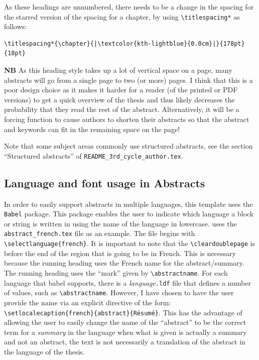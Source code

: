 \documentclass[12pt, twoside]{article}
\begin{document}
As these headings are unnumbered, there needs to be a change in the spacing for the starred version of the spacing for a chapter, by using \texttt{\textbackslash titlespacing*} as follows: 
\begin{lstlisting}[style=latexExampleForAuthors,  escapechar=|]
\titlespacing*{\chapter}{|\textcolor{kth-lightblue}{0.0cm}|}{178pt}{18pt}
\end{lstlisting}

\textbf{NB} As this heading style takes up a lot of vertical space on a page, many abstracts will go from a single page to two (or more) pages. I think that this is a poor design choice as it makes it harder for a reader (of the printed or PDF versions) to get a quick overview of the thesis and thus likely decreases the probability that they read the rest of the abstract. Alternatively, it will be a forcing function to cause authors to shorten their abstracts so that the abstract and keywords can fit in the remaining space on the page!

Note that some subject areas commonly use structured abstracts, see the section \enquote{Structured abstracts} of \texttt{README\_3rd\_cycle\_author.tex}.

\subsection{Language and font usage in Abstracts}
\label{sec:cycle3LanguagesInAbstracts}

In order to easily support abstracts in multiple languages, this template uses the \texttt{Babel} package. This package enables the user to indicate which language a block or string is written in using the name of the language in lowercase.  uses the \texttt{abstract\_french.tex} file as an example.
The file begins with \texttt{\textbackslash selectlanguage\{french\}}. It is important to note that the \texttt{\textbackslash cleardoublepage} is before the end of the region that is going to be in French. This is necessary because the running heading uses the French name for the abstract/summary. The running heading uses the \enquote{mark} given by \texttt{\textbackslash abstractname}. For each language that babel supports, there is a \hbox{\textit{language}\texttt{.ldf}} file that defines a number of values, such as \texttt{\textbackslash abstractname}. However, I have chosen to have the user provide the name via an explicit directive of the form: \texttt{\textbackslash setlocalecaption\{french\}\{abstract\}\{Résumé\}}. This has the advantage of allowing the user to easily change the name of the \enquote{abstract} to be the correct term for a \textit{summary} in the language when what is given is actually a summary and not an abstract, \ie the text is not necessarily a translation of the abstract in the language of the thesis.
\end{document}
